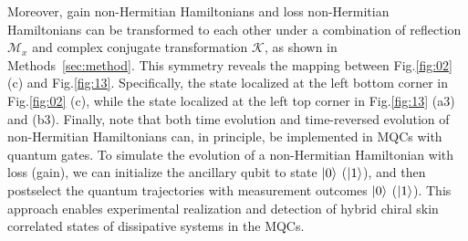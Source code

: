 \documentclass[longbibliography, aps, prx, amsmath, amssymb, amsfonts, twocolumn,superscriptaddress, footinbib]{revtex4-1}
\begin{document}

	Moreover, gain non-Hermitian Hamiltonians and loss non-Hermitian Hamiltonians can be transformed to each other under a combination of reflection $\mathcal{M}_x$ and complex conjugate transformation $\mathcal{K}$, as shown in Methods~\ref{sec:method}. 
	This symmetry reveals the mapping between Fig.\ref{fig:02} (c) and Fig.\ref{fig:13}. Specifically, the state localized at the left bottom corner in Fig.\ref{fig:02} (c), while the state localized at the left top corner in Fig.\ref{fig:13} (a3) and (b3).
	Finally, note that both time evolution and time-reversed evolution of non-Hermitian Hamiltonians can, in principle, be implemented in MQCs with quantum gates. To simulate the evolution of a non-Hermitian Hamiltonian with loss (gain), we can initialize the ancillary qubit to state $\ket{0}$ ($\ket{1}$), and then postselect the quantum trajectories with measurement outcomes $\ket{0}$ ($\ket{1}$). This approach enables experimental realization and detection of hybrid chiral skin correlated states of dissipative systems in the MQCs.



\end{document}

